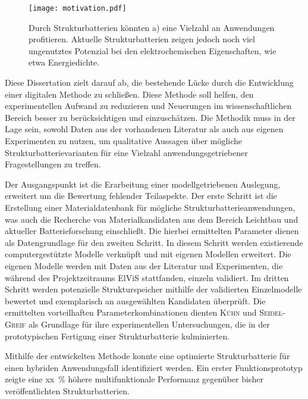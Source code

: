 \begin{figure}[ht]
        \center
	\texttt{[image: motivation.pdf]}
		\caption{\label{fig:motivation} Durch Strukturbatterien könnten a) eine Vielzahl an Anwendungen profitieren. Aktuelle Strukturbatterien zeigen jedoch noch viel ungenutztes Potenzial bei den elektrochemischen Eigenschaften, wie etwa Energiedichte.}
\end{figure}

Diese Dissertation zielt darauf ab, die bestehende Lücke durch die Entwicklung einer digitalen Methode zu schließen. Diese Methode soll helfen, den experimentellen Aufwand zu reduzieren und Neuerungen im wissenschaftlichen Bereich besser zu berücksichtigen und einzuschätzen. Die Methodik muss in der Lage sein, sowohl Daten aus der vorhandenen Literatur als auch aus eigenen Experimenten zu nutzen, um qualitative Aussagen über mögliche Strukturbatterievarianten für eine Vielzahl anwendungsgetriebener Fragestellungen zu treffen.

Der Ausgangspunkt ist die Erarbeitung einer modellgetriebenen Auslegung, erweitert um die Bewertung fehlender Teilaspekte. Der erste Schritt ist die Erstellung einer Materialdatenbank für mögliche Strukturbatterieanwendungen, was auch die Recherche von Materialkandidaten aus dem Bereich Leichtbau und aktueller Batterieforschung einschließt. Die hierbei ermittelten Parameter dienen als Datengrundlage für den zweiten Schritt. In diesem Schritt werden existierende computergestützte Modelle verknüpft und mit eigenen Modellen erweitert. Die eigenen Modelle werden mit Daten aus der Literatur und Experimenten, die während des Projektzeitraums ElViS stattfanden, einzeln validiert. Im dritten Schritt werden potenzielle Strukturspeicher mithilfe der validierten Einzelmodelle bewertet und exemplarisch an ausgewählten Kandidaten überprüft. Die ermittelten vorteilhaften Parameterkombinationen dienten \textsc{Kühn} und \textsc{Seidel-Greif} als Grundlage für ihre experimentellen Untersuchungen, die in der prototypischen Fertigung einer Strukturbatterie kulminierten.

Mithilfe der entwickelten Methode konnte eine optimierte Strukturbatterie für einen hybriden Anwendungsfall identifiziert werden. Ein erster Funktionsprototyp zeigte eine xx~\% höhere multifunktionale Performanz gegenüber bisher veröffentlichten Strukturbatterien.



